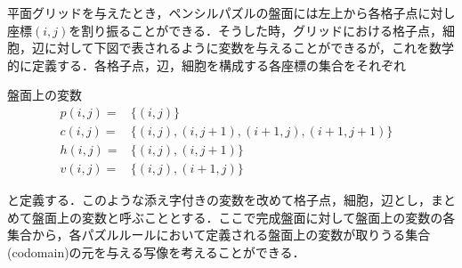 平面グリッドを与えたとき，ペンシルパズルの盤面には左上から各格子点に対し座標$(i,j)$を割り振ることができる．そうした時，グリッドにおける格子点，細胞，辺に対して下図で表されるように変数を与えることができるが，これを数学的に定義する．各格子点，辺，細胞を構成する各座標の集合をそれぞれ
\begin{definition}\label{VariableDefinition}\textup{盤面上の変数}
  \begin{align}
    p(i,j)= & \{(i,j)\}                              & \\
    c(i,j)= & \{(i,j), (i,j+1), (i+1,j), (i+1,j+1)\} & \\
    h(i,j)= & \{(i,j), (i,j+1)\}                     & \\
    v(i,j)= & \{(i,j), (i+1,j)\}                     &
  \end{align}
\end{definition}
と定義する．このような添え字付きの変数を改めて格子点，細胞，辺とし，まとめて盤面上の変数と呼ぶこととする．ここで完成盤面に対して盤面上の変数の各集合から，各パズルルールにおいて定義される盤面上の変数が取りうる集合(codomain)の元を与える写像を考えることができる．

